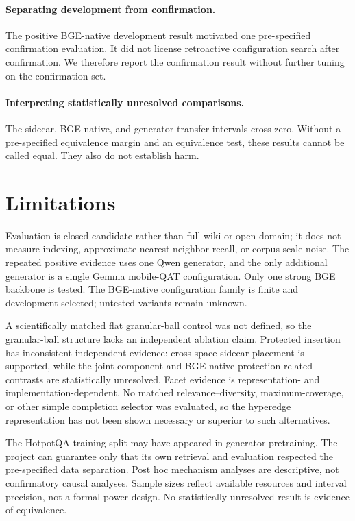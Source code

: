 \documentclass[11pt]{article}
\begin{document}
\paragraph{Separating development from confirmation.}
The positive BGE-native development result motivated one pre-specified
confirmation evaluation. It did not license retroactive configuration search
after confirmation. We therefore report the confirmation result without
further tuning on the confirmation set.

\paragraph{Interpreting statistically unresolved comparisons.}
The sidecar, BGE-native, and generator-transfer intervals cross zero. Without a
pre-specified equivalence margin and an equivalence test, these results cannot
be called equal. They also do not establish harm.

\section{Limitations}

Evaluation is closed-candidate rather than full-wiki or open-domain; it does
not measure indexing, approximate-nearest-neighbor recall, or corpus-scale
noise. The repeated positive evidence uses one Qwen generator, and the only
additional generator is a single Gemma mobile-QAT configuration. Only one
strong BGE backbone is tested. The BGE-native configuration family is finite
and development-selected; untested variants remain unknown.

A scientifically matched flat granular-ball control was not defined, so the
granular-ball structure lacks an independent ablation claim. Protected
insertion has inconsistent independent evidence: cross-space sidecar placement
is supported, while the joint-component and BGE-native protection-related
contrasts are statistically unresolved. Facet evidence is representation- and
implementation-dependent.
No matched relevance--diversity, maximum-coverage, or other simple completion
selector was evaluated, so the hyperedge representation has not been shown
necessary or superior to such alternatives.

The HotpotQA training split may have appeared in generator pretraining. The
project can guarantee only that its own retrieval and evaluation respected the
pre-specified data separation. Post hoc mechanism analyses are descriptive, not
confirmatory causal analyses. Sample sizes reflect available resources and
interval precision, not a formal power design. No statistically unresolved result is
evidence of equivalence.
\end{document}
